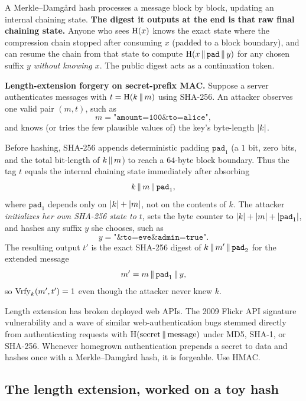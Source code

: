\begin{intuitionbox}
A Merkle--Damg\aa{}rd hash processes a message block by block, updating an internal chaining state. \textbf{The digest it outputs at the end is that raw final chaining state.} Anyone who sees $\operatorname{H}(x)$ knows the exact state where the compression chain stopped after consuming $x$ (padded to a block boundary), and can resume the chain from that state to compute $\operatorname{H}(x\,\|\,\texttt{pad}\,\|\, y)$ for any chosen suffix $y$ \emph{without knowing $x$}. The public digest acts as a continuation token.
\end{intuitionbox}

\begin{attackbox}
\textbf{Length-extension forgery on secret-prefix MAC.} Suppose a server authenticates messages with $t = \operatorname{H}(k\,\|\, m)$ using SHA-256. An attacker observes one valid pair $(m, t)$, such as
\[
  m = \texttt{"amount=100\&to=alice"},
\]
and knows (or tries the few plausible values of) the key's byte-length $\lvert k\rvert$.

Before hashing, SHA-256 appends deterministic padding $\texttt{pad}_1$ (a $1$ bit, zero bits, and the total bit-length of $k \,\|\, m$) to reach a $64$-byte block boundary. Thus the tag $t$ equals the internal chaining state immediately after absorbing
\[
  k \,\|\, m \,\|\, \texttt{pad}_1,
\]
where $\texttt{pad}_1$ depends only on $\lvert k\rvert + \lvert m\rvert$, not on the contents of $k$. The attacker \emph{initializes her own SHA-256 state to $t$}, sets the byte counter to $\lvert k\rvert + \lvert m\rvert + \lvert\texttt{pad}_1\rvert$, and hashes any suffix $y$ she chooses, such as
\[
  y = \texttt{"\&to=eve\&admin=true"}.
\]
The resulting output $t'$ is the exact SHA-256 digest of $k \,\|\, m' \,\|\, \texttt{pad}_2$ for the extended message
\[
  m' = m \,\|\, \texttt{pad}_1 \,\|\, y,
\]
so $\operatorname{Vrfy}_k(m', t') = 1$ even though the attacker never knew $k$.
\end{attackbox}

\begin{trapbox}
Length extension has broken deployed web APIs. The 2009 Flickr API signature vulnerability and a wave of similar web-authentication bugs stemmed directly from authenticating requests with $\operatorname{H}(\text{secret}\,\|\,\text{message})$ under MD5, SHA-1, or SHA-256. Whenever homegrown authentication prepends a secret to data and hashes once with a Merkle--Damg\aa{}rd hash, it is forgeable. Use HMAC.
\end{trapbox}

\subsection{The length extension, worked on a toy hash}
\label{ch15:lenext-toy}

